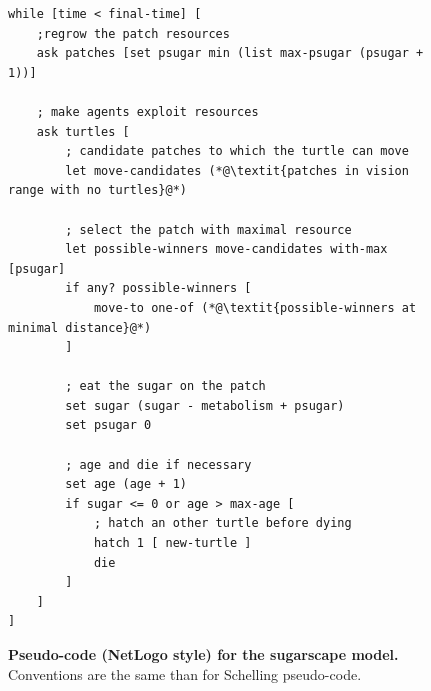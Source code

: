 \documentclass{JASSS}
\begin{document}
\begin{figure}[!t]
\caption{\textbf{Pseudo-code (NetLogo style) for the sugarscape model.} Conventions are the same than for Schelling pseudo-code.}\label{frame:sugarscapecode}
\bigskip
\begin{mdframed}
\begin{lstlisting}
while [time < final-time] [
    ;regrow the patch resources
    ask patches [set psugar min (list max-psugar (psugar + 1))]
	
    ; make agents exploit resources
    ask turtles [
		; candidate patches to which the turtle can move
		let move-candidates (*@\textit{patches in vision range with no turtles}@*)
		
		; select the patch with maximal resource
		let possible-winners move-candidates with-max [psugar]
		if any? possible-winners [
			move-to one-of (*@\textit{possible-winners at minimal distance}@*)
		]
		
		; eat the sugar on the patch
		set sugar (sugar - metabolism + psugar)
		set psugar 0
		
		; age and die if necessary
		set age (age + 1)
		if sugar <= 0 or age > max-age [
			; hatch an other turtle before dying
			hatch 1 [ new-turtle ]
			die
		]
	]
]
\end{lstlisting}
\end{mdframed}
\end{figure}






\end{document}
